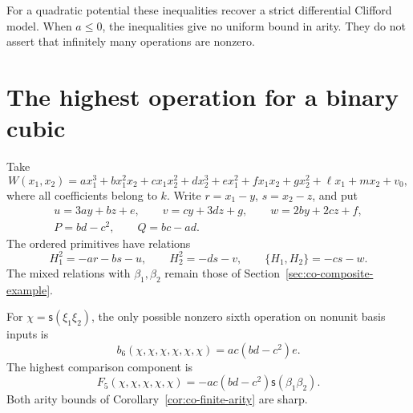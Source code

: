 For a quadratic potential these inequalities recover a strict
differential Clifford model. When \(a\le0\), the inequalities
give no uniform bound in arity. They do not assert that infinitely
many operations are nonzero.

\section{The highest operation for a binary cubic}
\label{sec:co-binary-cubic}

Take
\[
 W(x_1,x_2)=ax_1^3+bx_1^2x_2+cx_1x_2^2+dx_2^3
               +ex_1^2+fx_1x_2+gx_2^2+\ell x_1+m x_2+v_0,
\]
where all coefficients belong to \(k\). Write
\(r=x_1-y\), \(s=x_2-z\), and put
\begin{gather*}
 u=3ay+bz+e,\qquad v=cy+3dz+g,\qquad w=2by+2cz+f,
 \\
 P=bd-c^2,\qquad Q=bc-ad.
\end{gather*}
The ordered primitives have relations
\[
 H_1^2=-ar-bs-u,\qquad H_2^2=-ds-v,\qquad
 \{H_1,H_2\}=-cs-w.
\]
The mixed relations with \(\beta_1,\beta_2\) remain those of
Section~\ref{sec:co-composite-example}.

\begin{proposition}\label{prop:co-sixth}
For \(\chi=\mathsf{s}(\xi_1\xi_2)\), the only possible
nonzero sixth operation on nonunit basis inputs is
\[
 b_6(\chi,\chi,\chi,\chi,\chi,\chi)=ac(bd-c^2)e.
\]
The highest comparison component is
\[
 F_5(\chi,\chi,\chi,\chi,\chi)
       =-ac(bd-c^2)\mathsf{s}(\beta_1\beta_2).
\]
Both arity bounds of Corollary~\ref{cor:co-finite-arity} are sharp.
\end{proposition}

